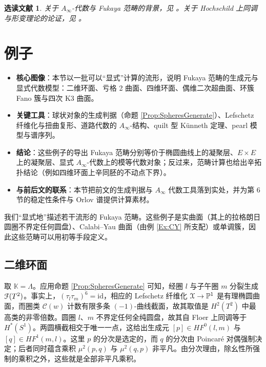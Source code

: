 \documentclass[11pt,a4paper]{article}
\numberwithin{equation}{section}
\newtheorem*{Notes}{选读文献}
\newcommand{\bP}{\mathbb{P}}
\newcommand{\bK}{\mathbb{K}}
\newcommand{\scrX}{\EuScript{X}}
\newcommand{\scrF}{\EuScript{F}}
\newcommand{\id}{\mathrm{id}}
\begin{document}
\begin{Notes} 关于 $A_{\infty}$-代数与 Fukaya 范畴的背景，见 \cite{FCPLT, FO3}。关于 Hochschild 上同调与形变理论的论证，见 \cite{Seidel:HMSquartic, Seidel:HMSgenus2}。
\end{Notes}




\section{例子}\label{Sec:Examples}

\begin{keypoints}
\begin{itemize}
  \item \textbf{核心图像}：本节以一批可以“显式”计算的流形，说明 Fukaya 范畴的生成元与显式代数模型：二维环面、亏格 2 曲面、四维环面、偶维二次超曲面、环簇 Fano 簇与四次 K3 曲面。
  \item \textbf{关键工具}：球状对象的生成判据（命题 \ref{Prop:SpheresGenerate}）、Lefschetz 纤维化与扭曲复形、道路代数的 $A_{\infty}$-结构、quilt 型 Künneth 定理、pearl 模型与谱序列。
  \item \textbf{结论}：这些例子的导出 Fukaya 范畴分别等价于椭圆曲线上的凝聚层、$E\times E$ 上的凝聚层、显式 $A_{\infty}$-代数上的模等代数对象；反过来，范畴计算也给出辛拓扑结论（例如四维环面上辛同胚的不动点下界）。
  \item \textbf{与前后文的联系}：本节把前文的生成判据与 $A_\infty$ 代数工具落到实处，并为第 6 节的稳定性条件与 Orlov 谱提供计算素材。
\end{itemize}
\end{keypoints}

我们“显式地”描述若干流形的 Fukaya 范畴。这些例子是实曲面（其上的拉格朗日圆圈不界定任何圆盘）、Calabi--Yau 曲面（由例 \ref{Ex:CY} 所支配）或单调簇，因此这些范畴可以用初等手段定义。

\subsection{二维环面} 取 $\bK = \Lambda$。应用命题 \ref{Prop:SpheresGenerate} 可知，经圈 $l$ 与子午圈 $m$ 分裂生成 $\scrF(T^2)$。事实上，$(\tau_l \tau_m)^6 = \id$，相应的 Lefschetz 纤维化 $\scrX \rightarrow \bP^1$ 是有理椭圆曲面，而圈类 $\mathcal{C}(w)$ 计数有限多条 $(-1)$-曲线截面，故其取值是 $H^2(T^2)$ 中最高类的非零倍数。圆圈 $l$、$m$ 不界定任何全纯圆盘，故其自 Floer 上同调等于 $H^*(S^1)$。两圆横截相交于唯一一点，这给出生成元 $[p]\in HF^0(l,m)$ 与 $[q]\in HF^1(m,l)$。这里 $p$ 的分次是选定的，而 $q$ 的分次由 Poincaré 对偶强制决定；后者同时蕴含乘积 $\mu^2(p,q)$ 与 $\mu^2(q,p)$ 非平凡。由分次理由，除幺性所强制的乘积之外，这些就是全部非平凡乘积。
\end{document}
